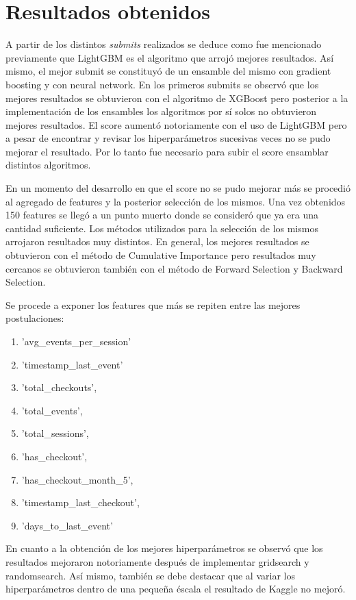 \documentclass[a4paper]{article}
\begin{document}
\section{Resultados obtenidos}

A partir de los distintos \textit{submits} realizados se deduce como fue mencionado previamente que LightGBM es el algoritmo que arrojó mejores resultados. Así mismo, el mejor submit se constituyó de un ensamble del mismo con gradient boosting y con neural network. En los primeros submits se observó que los mejores resultados se obtuvieron con el algoritmo de XGBoost pero posterior a la implementación de los ensambles los algoritmos por sí solos no obtuvieron mejores resultados. El score aumentó notoriamente con el uso de LightGBM pero a pesar de encontrar y revisar los hiperparámetros sucesivas veces no se pudo mejorar el resultado. Por lo tanto fue necesario para subir el score ensamblar distintos algoritmos.

En un momento del desarrollo en que el score no se pudo mejorar más se procedió al agregado de features y la posterior selección de los mismos. Una vez obtenidos 150 features se llegó a un punto muerto donde se consideró que ya era una cantidad suficiente. Los métodos utilizados para la selección de los mismos arrojaron resultados muy distintos. En general, los mejores resultados se obtuvieron con el método de Cumulative Importance pero resultados muy cercanos se obtuvieron también con el método de Forward Selection y Backward Selection. 

Se procede a exponer los features que más se repiten entre las mejores postulaciones:

\begin{enumerate}
	\item 'avg\_events\_per\_session'
	\item 'timestamp\_last\_event'
	\item 'total\_checkouts',
	\item 'total\_events',
	\item 'total\_sessions',
	\item 'has\_checkout',
	\item 'has\_checkout\_month\_5',
	\item 'timestamp\_last\_checkout',
	\item 'days\_to\_last\_event'
\end{enumerate}

En cuanto a la obtención de los mejores hiperparámetros se observó que los resultados mejoraron notoriamente después de implementar gridsearch y randomsearch. Así mismo, también se debe destacar que al variar los hiperparámetros dentro de una pequeña éscala el resultado de Kaggle no mejoró. 
\end{document}
